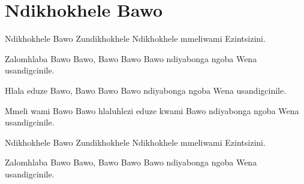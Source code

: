 \starttocol
\chapter{Ndikhokhele Bawo}
\nexttocol
\hfill{\it }
\stoptocol
\starttocol
\startlines
{\sc Ndikhokhele} Bawo
	Zundikhokhele
Ndikhokhele mmeliwami
	Ezintsizini.

Zalomhlaba Bawo
	Bawo, Bawo Bawo
	Bawo ndiyabonga ngoba
	Wena usandigcinile.

Hlala eduze 
	Bawo, Bawo Bawo
	Bawo ndiyabonga ngoba
	Wena usandigcinile.

Mmeli wami Bawo
	Bawo hlaluhlezi eduze kwami
	Bawo ndiyabonga ngoba
	Wena usandigcinile.

Ndikhokhele Bawo
	Zundikhokhele
Ndikhokhele mmeliwami
	Ezintsizini.

Zalomhlaba Bawo
	Bawo, Bawo Bawo
Bawo ndiyabonga ngoba
	Wena usandigcinile.
\stoplines
\nexttocol

\stoptocol
